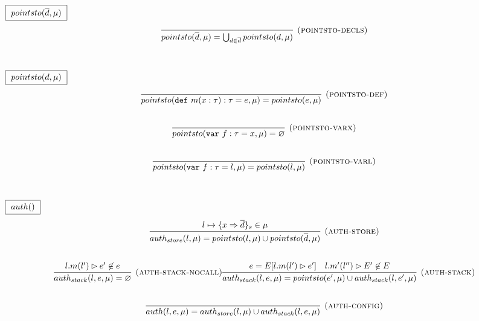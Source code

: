 \documentclass{llncs}
\newcommand{\keywadj}[1]{\mathtt{#1}}
\newcommand{\keyw}[1]{\keywadj{#1}~}
\begin{document}
$\fbox{$~pointsto(\overline{d}, \mu)~$}$
\[
\begin{array}{c}
\infer[\textsc{(pointsto-decls)}]
  {pointsto(\overline{d}, \mu) = \bigcup_{d \in \overline{d}} pointsto(d, \mu)}
  {}\\[5ex]
  
\end{array}
\]

$\fbox{$~pointsto(d, \mu)~$}$
\[
\begin{array}{c}

\infer[\textsc{(pointsto-def)}]
  {pointsto(\keyw{def} m(x:\tau):\tau = e, \mu) = pointsto(e, \mu)}
  {}\\[5ex]
  
\infer[\textsc{(pointsto-varx)}]
  {pointsto(\keyw{var} f:\tau = x,\mu) = \varnothing}
  {}\\[5ex]
\infer[\textsc{(pointsto-varl)}]
  {pointsto(\keyw{var} f:\tau = l,\mu) = pointsto(l,\mu)}
  {}\\[5ex]

\end{array}
\]

%
%

$\fbox{$~auth()~$}$
\[
\begin{array}{c}
\infer[\textsc{(auth-store)}]
  {auth_{store}(l,\mu) = pointsto(l, \mu) \cup pointsto(\overline{d},\mu)}
  {l \mapsto \{ x \Rightarrow \overline{d} \}_{s} \in \mu}\\[5ex]

\infer[\textsc{(auth-stack-nocall)}]
  {auth_{stack}(l, e, \mu) = \varnothing}
  {l.m(l') \rhd e' \not\in e}%
\infer[\textsc{(auth-stack)}]
  {auth_{stack}(l, e, \mu) = pointsto(e',\mu) \cup auth_{stack}(l,e',\mu)}
  {e = E[l.m(l') \rhd e'] & l.m'(l'') \rhd E' \not\in E}\\[5ex]
  
\infer[\textsc{(auth-config)}]
  {auth(l,e, \mu) = auth_{store}(l,\mu) \cup auth_{stack}(l,e,\mu)}
  {}\\[5ex]

\end{array}
\]
\end{document}
